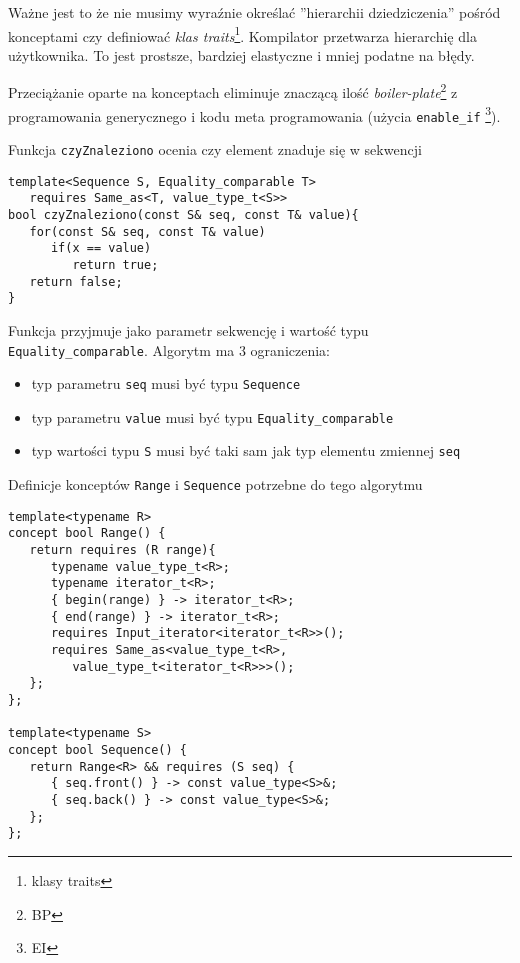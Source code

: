 \documentclass[11pt, a4paper]{article}
\begin{document}
Ważne jest to że nie musimy wyraźnie określać ”hierarchii dziedziczenia” pośród konceptami czy definiować \emph{klas traits}\footnote{klasy traits}. Kompilator przetwarza hierarchię dla użytkownika. To jest prostsze, bardziej elastyczne i mniej podatne na błędy.

Przeciążanie oparte na konceptach eliminuje znaczącą ilość \emph{boiler-plate}\footnote{BP} z programowania generycznego i kodu meta programowania (użycia \verb#enable_if# \footnote{EI}).

Funkcja \verb#czyZnaleziono# ocenia czy element znaduje się w sekwencji

\begin{lstlisting}[frame=single]
template<Sequence S, Equality_comparable T>
   requires Same_as<T, value_type_t<S>>
bool czyZnaleziono(const S& seq, const T& value){
   for(const S& seq, const T& value)
      if(x == value)
         return true;
   return false;
}
\end{lstlisting}

Funkcja przyjmuje jako parametr sekwencję i wartość typu \verb#Equality_comparable#. Algorytm ma 3 ograniczenia:

\begin{itemize}

\item typ parametru \verb#seq# musi być typu \verb#Sequence#
\item typ parametru \verb#value# musi być typu \verb#Equality_comparable#
\item typ wartości typu \verb#S# musi być taki sam jak typ elementu zmiennej \verb#seq#

\end{itemize}

Definicje konceptów \verb#Range# i \verb#Sequence# potrzebne do tego algorytmu

\begin{lstlisting}[frame=single]
template<typename R>
concept bool Range() {
   return requires (R range){
      typename value_type_t<R>;
      typename iterator_t<R>;
      { begin(range) } -> iterator_t<R>;
      { end(range) } -> iterator_t<R>;
      requires Input_iterator<iterator_t<R>>();
      requires Same_as<value_type_t<R>,
         value_type_t<iterator_t<R>>>();
   };
};

template<typename S>
concept bool Sequence() {
   return Range<R> && requires (S seq) {
      { seq.front() } -> const value_type<S>&;
      { seq.back() } -> const value_type<S>&;
   };
};

\end{lstlisting}
\end{document}
